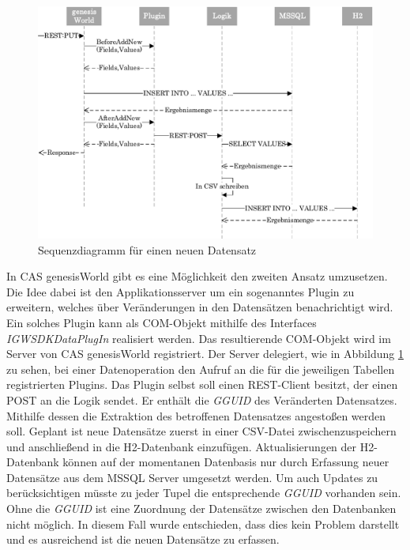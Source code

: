 \begin{figure}[htbp]
\centering
  \includegraphics[width=1.0\textwidth, width=1.0\textwidth]{pics/sequenzdiagramm.pdf}
\caption{Sequenzdiagramm für einen neuen Datensatz}
\label{konzept_sequenz}
\end{figure}

In CAS genesisWorld gibt es eine Möglichkeit den zweiten Ansatz umzusetzen. Die Idee dabei ist den Applikationsserver um ein sogenanntes Plugin zu erweitern, welches über Veränderungen in den Datensätzen benachrichtigt wird. Ein solches Plugin kann als COM-Objekt mithilfe des Interfaces \textit{IGWSDKDataPlugIn} realisiert werden. Das resultierende COM-Objekt wird im Server von CAS genesisWorld registriert. Der Server delegiert, wie in Abbildung \ref{konzept_sequenz} zu sehen, bei einer Datenoperation den Aufruf an die für die jeweiligen Tabellen registrierten Plugins. Das Plugin selbst soll einen REST-Client besitzt, der einen POST an die Logik sendet. Er enthält die \textit{GGUID} des Veränderten Datensatzes. Mithilfe dessen die Extraktion des betroffenen Datensatzes angestoßen werden soll. Geplant ist neue Datensätze zuerst in einer CSV-Datei zwischenzuspeichern und anschließend in die H2-Datenbank einzufügen. Aktualisierungen der H2-Datenbank können auf der momentanen Datenbasis nur durch Erfassung neuer Datensätze aus dem MSSQL Server umgesetzt werden. Um auch Updates zu berücksichtigen müsste zu jeder Tupel die entsprechende \textit{GGUID} vorhanden sein. Ohne die \textit{GGUID} ist eine Zuordnung der Datensätze zwischen den Datenbanken nicht möglich. In diesem Fall wurde entschieden, dass dies kein Problem darstellt und es ausreichend ist die neuen Datensätze zu erfassen.

